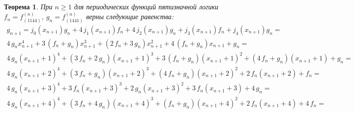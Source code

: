 \documentclass[bibliography=totoc, a4paper, 14pt]{extarticle}
\newtheorem{myth}{Теорема}
\begin{document}
\begin{myth} При $n \geqslant 1 $ для периодических функций пятизначной логики $f_n = f^{\left(n\right)}_{\left(1144\right)}$,
$g_n = f^{\left(n\right)}_{\left(1441\right)}$ верны следующие равенства:
$$\begin{array}{l}
 g_{n+1} = j_0(x_{n+1})g_n + 4\,j_1(x_{n+1})f_n + 4\,j_2(x_{n+1})g_n + j_3(x_{n+1})f_n + j_4(x_{n+1})g_n=\\
4 \, g_{n} x_{n+1}^{4} + 3 \, {\left(f_{n} + g_{n}\right)} x_{n+1}^{3} + {\left(2 \, f_{n} + 3 \, g_{n}\right)} x_{n+1}^{2} + 4 \, {\left(f_{n} + g_{n}\right)} x_{n+1} + g_{n}=\\
4 \, g_{n} {\left(x_{n+1} + 1\right)}^{4} + {\left(3 \, f_{n} + 2 \, g_{n}\right)} {\left(x_{n+1} + 1\right)}^{3} + 3 \, {\left(f_{n} + g_{n}\right)} {\left(x_{n+1} + 1\right)}^{2} + {\left(4 \, f_{n} + g_{n}\right)} {\left(x_{n+1} + 1\right)} + g_{n}=\\
4 \, g_{n} {\left(x_{n+1} + 2\right)}^{4} + {\left(3 \, f_{n} + g_{n}\right)} {\left(x_{n+1} + 2\right)}^{3} + {\left(4 \, f_{n} + g_{n}\right)} {\left(x_{n+1} + 2\right)}^{2} + 2 \, f_{n} {\left(x_{n+1} + 2\right)} + f_{n}=\\
4 \, g_{n} {\left(x_{n+1} + 3\right)}^{4} + 3 \, f_{n} {\left(x_{n+1} + 3\right)}^{3} + 2 \, g_{n} {\left(x_{n+1} + 3\right)}^{2} + 3 \, f_{n} {\left(x_{n+1} + 3\right)} + 4 \, g_{n}=\\
4 \, g_{n} {\left(x_{n+1} + 4\right)}^{4} + {\left(3 \, f_{n} + 4 \, g_{n}\right)} {\left(x_{n+1} + 4\right)}^{3} + {\left(f_{n} + g_{n}\right)} {\left(x_{n+1} + 4\right)}^{2} + 2 \, f_{n} {\left(x_{n+1} + 4\right)} + 4 \, f_{n}=\\
\end{array}$$
\end{myth}
\end{document}
